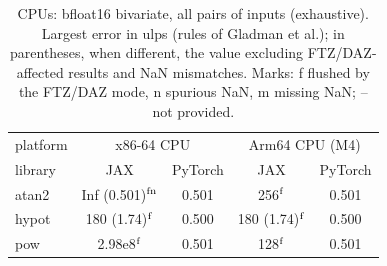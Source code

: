 \begin{table}
\centering
\begin{small}
\begin{tabular}{|l|cc|cc|}
\hline
platform & \multicolumn{2}{c|}{x86-64 CPU} & \multicolumn{2}{c|}{Arm64 CPU (M4)} \\
library & JAX & PyTorch & JAX & PyTorch \\ \hline
atan2 & Inf (0.501)$^{\rm fn}$ & 0.501 & 256$^{\rm f}$ & 0.501 \\
hypot & 180 (1.74)$^{\rm f}$ & 0.500 & 180 (1.74)$^{\rm f}$ & 0.500 \\
pow & 2.98e8$^{\rm f}$ & 0.501 & 128$^{\rm f}$ & 0.501 \\
\hline
\end{tabular}
\end{small}
\caption{CPUs: bfloat16 bivariate, all pairs of inputs (exhaustive). Largest error in ulps (rules of Gladman et al.); in parentheses, when different, the value excluding FTZ/DAZ-affected results and NaN mismatches. Marks: f flushed by the FTZ/DAZ mode, n spurious NaN, m missing NaN; -- not provided.}
\label{tab:bf16bicpu}
\end{table}
